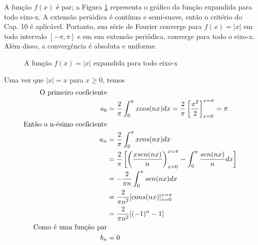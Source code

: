A função $f(x)$ é par; a Figura \ref{fig:exemplo2} representa o gráfico da função 
expandida para todo eixo-x. A extensão periódica é contínua e semi-suave, então o critério
do Cap. 10 é aplicável. Portanto, sua série de Fourier converge para $f(x) = |x|$ em 
todo intervalo $[-\pi,\pi]$ e em sua extensão periódica, converge para todo o eixo-x.
Além disso, a convergência é absoluta e uniforme.

\begin{figure}[H]

    \caption{A função $f(x) = |x|$ expandida para todo eixo-x}
    \label{fig:exemplo2}
\end{figure}

Uma vez que $|x| = x$ para $x \geq 0$, temos
\begin{equation}
\notag
\label{eq:exemplo2SF}
    \begin{split}
        \text{O primeiro coeficiente}&\\
        a_0 &= \dfrac{2}{\pi}\int_0^{\pi}x cos(nx)dx = \dfrac{2}{\pi} \left[\dfrac{x^2}{2}\right]_{x=0}^{x=\pi} = \pi\\
        \text{Então o n-ésimo coeficiente}&\\
        a_n &= \dfrac{2}{\pi}\int_{0}^{\pi}x cos(nx)dx\\
        &= \dfrac{2}{\pi}\left[\left(\dfrac{x sen(nx)}{n}\right)_{x=0}^{x=\pi} - \int_{0}^{\pi}\dfrac{sen(nx)}{n}dx\right]\\
        &= -\dfrac{2}{\pi n}\int_{0}^{\pi}sen(nx)dx\\
        &= \dfrac{2}{\pi n^2}[cons(nx)]_{x=0}^{x=\pi}\\
        &= \dfrac{2}{\pi n^2}[(-1)^n - 1]\\
        \text{Como é uma função par}&\\
        b_n &= 0
    \end{split}
\end{equation}

